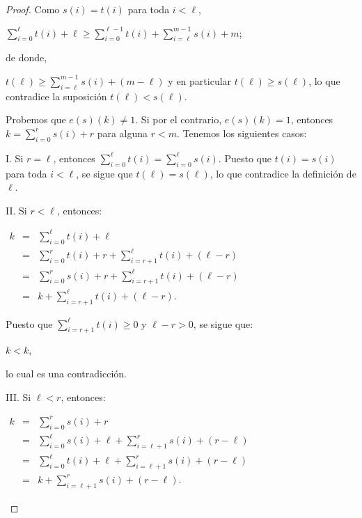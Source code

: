 \documentclass[11pt]{unam_tesis1}
\theoremstyle{MyThmStyle}
\theoremstyle{definition}
\theoremstyle{plain}
\theoremstyle{remark}
\let\geq\geqslant
\begin{document}
\begin{proof}
Como $s(i)=t(i)$ para toda $i<\ell$,

\begin{center}
$\sum\limits_{i=0}^{\ell}t(i)+ \ell \geq \sum\limits_{i=0}^{\ell-1}t(i)+\sum\limits_{i=\ell}^{m-1}s(i)+m$;
\end{center}
de donde,

$t(\ell) \geq \sum\limits_{i=\ell}^{m-1}s(i)+(m-\ell)$ y en particular $t(\ell)\geq s(\ell)$, lo que contradice la suposici\'on $t(\ell)<s(\ell)$.


Probemos que $e(s)(k)\neq 1$. Si por el contrario, $e(s)(k)=1$, entonces $k=\sum\limits_{i=0}^{r}s(i)+r$ para alguna $r<m$. Tenemos los siguientes casos:

I. Si $r=\ell$, entonces $\sum\limits_{i=0}^{\ell}t(i)=\sum\limits_{i=0}^{\ell}s(i)$. Puesto que $t(i)=s(i)$ para toda  $i<\ell$, se sigue que $t(\ell)=s(\ell)$, lo que contradice la definici\'on de $\ell$.

II. Si $r<\ell$, entonces:

\begin{center}
$\begin{array} {lcl} k & = &  \sum\limits_{i=0}^{\ell}t(i)+ \ell \\ & = & \sum\limits_{i=0}^{r}t(i)+ r +\sum\limits_{i=r+1}^{\ell}t(i)+(\ell-r) \\ & = & \sum\limits_{i=0}^{r}s(i)+r + \sum\limits_{i=r+1}^{\ell}t(i)+(\ell-r) \\ & = & k+ \sum\limits_{i=r+1}^{\ell}t(i)+(\ell-r). \end{array}$
\end{center}

Puesto que $\sum\limits_{i=r+1}^{\ell}t(i)\geq 0$ y $\ell-r>0$, se sigue que:

\begin{center}
$k < k$,
\end{center}

lo cual es una contradicci\'on.

III. Si $\ell<r$, entonces:

\begin{center}
$\begin{array} {lcl} k & = &  \sum\limits_{i=0}^{r}s(i)+ r \\ & = &  \sum\limits_{i=0}^{\ell}s(i)+\ell +\sum\limits_{i=\ell+1}^{r}s(i) + (r-\ell) \\ & = & \sum\limits_{i=0}^{\ell}t(i)+\ell+\sum\limits_{i=\ell+1}^{r}s(i)+(r-\ell) \\ & = & k+ \sum\limits_{i=\ell+1}^{r}s(i)+(r-\ell). \end{array}$
\end{center}


\end{proof}
\end{document}
